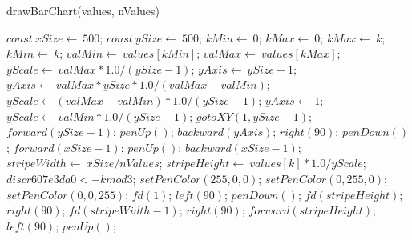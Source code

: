 \documentclass[a4paper,10pt]{article}
\begin{document}
\begin{algorithm}
\caption{drawBarChart(values, nValues)}
\begin{algorithmic}[5]

\STATE {}
\STATE {}
\STATE {}
\STATE {}
  \STATE \(const\ xSize\gets\ 500\);
  \STATE \(const\ ySize\gets\ 500\);
  \STATE \(kMin\gets\ 0\);
  \STATE \(kMax\gets\ 0\);
      \STATE \(kMax\gets\ k\);
    \ELSE
        \STATE \(kMin\gets\ k\);
      \ENDIF
    \ENDIF
  \ENDFOR
  \STATE \(valMin\gets\ values[kMin]\);
  \STATE \(valMax\gets\ values[kMax]\);
  \STATE \(yScale\gets\ valMax*1.0/(ySize-1)\);
  \STATE \(yAxis\gets\ ySize-1\);
      \STATE \(yAxis\gets\ valMax*ySize*1.0/(valMax-valMin)\);
      \STATE \(yScale\gets(valMax-valMin)*1.0/(ySize-1)\);
    \ELSE
      \STATE \(yAxis\gets\ 1\);
      \STATE \(yScale\gets\ valMin*1.0/(ySize-1)\);
    \ENDIF
  \ENDIF
  \STATE \(gotoXY(1,ySize-1)\);
  \STATE \(forward(ySize-1)\);
  \STATE \(penUp()\);
  \STATE \(backward(yAxis)\);
  \STATE \(right(90)\);
  \STATE \(penDown()\);
  \STATE \(forward(xSize-1)\);
  \STATE \(penUp()\);
  \STATE \(backward(xSize-1)\);
  \STATE \(stripeWidth\gets\ xSize/nValues\);
    \STATE \(stripeHeight\gets\ values[k]*1.0/yScale\);
    \STATE \(discr607e3da0 <- k mod 3\);
      \STATE \(setPenColor(255,0,0)\);
      \STATE \(setPenColor(0,255,0)\);
      \STATE \(setPenColor(0,0,255)\);
    \ENDIF
    \STATE \(fd(1)\);
    \STATE \(left(90)\);
    \STATE \(penDown()\);
    \STATE \(fd(stripeHeight)\);
    \STATE \(right(90)\);
    \STATE \(fd(stripeWidth-1)\);
    \STATE \(right(90)\);
    \STATE \(forward(stripeHeight)\);
    \STATE \(left(90)\);
    \STATE \(penUp()\);
  \ENDFOR

\end{algorithmic}
\end{algorithm}
\end{document}
